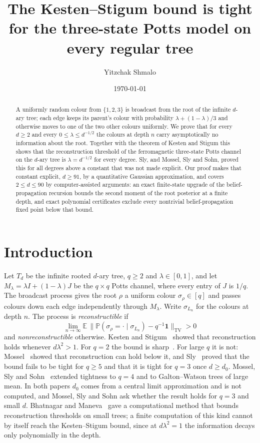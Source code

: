 \documentclass[11pt]{amsart}
\title[The three-state Potts model on regular trees]{The Kesten--Stigum bound is tight for the three-state Potts model on every regular tree}
\author{Yitzchak Shmalo}
\date{\today}
\theoremstyle{definition}
\theoremstyle{remark}
\newcommand{\E}{\mathbb{E}}
\newcommand{\PP}{\mathbb{P}}
\newcommand{\one}{\mathbf{1}}
\begin{document}
\begin{abstract}
A uniformly random colour from $\{1,2,3\}$ is broadcast from the root of the infinite $d$-ary tree; each
edge keeps its parent's colour with probability $\lambda+(1-\lambda)/3$ and otherwise moves to one of the
two other colours uniformly. We prove that for every $d\ge2$ and every $0\le\lambda\le d^{-1/2}$ the
colours at depth $n$ carry asymptotically no information about the root. Together with the theorem of
Kesten and Stigum this shows that the reconstruction threshold of the ferromagnetic three-state Potts
channel on the $d$-ary tree is $\lambda=d^{-1/2}$ for every degree. Sly, and Mossel, Sly and Sohn, proved
this for all degrees above a constant that was not made explicit. Our proof makes that constant explicit,
$d\ge91$, by a quantitative Gaussian approximation, and covers $2\le d\le90$ by computer-assisted
arguments: an exact finite-state upgrade of the belief-propagation recursion bounds the second moment of
the root posterior at a finite depth, and exact polynomial certificates exclude every nontrivial
belief-propagation fixed point below that bound.
\end{abstract}

\maketitle

\section{Introduction}

Let $T_d$ be the infinite rooted $d$-ary tree, $q\ge2$ and $\lambda\in[0,1]$, and let
$M_\lambda=\lambda I+(1-\lambda)J$ be the $q\times q$ Potts channel, where every entry of $J$ is $1/q$.
The broadcast process gives the root $\rho$ a uniform colour $\sigma_\rho\in[q]$ and passes colours
down each edge independently through $M_\lambda$. Write $\sigma_{L_n}$ for the colours at depth $n$. The
process is \emph{reconstructible} if
\[
\lim_{n\to\infty}\E\,\big\|\PP(\sigma_\rho=\cdot\mid\sigma_{L_n})-q^{-1}\one\big\|_{\mathrm{TV}}>0
\]
and \emph{nonreconstructible} otherwise. Kesten and Stigum~\cite{KS66} showed that reconstruction holds
whenever $d\lambda^2>1$. For $q=2$ the bound is sharp~\cite{BRZ95,EKPS00}. For large $q$ it is not:
Mossel~\cite{Mos01} showed that reconstruction can hold below it, and Sly~\cite{Sly11} proved that the
bound fails to be tight for $q\ge5$ and that it is tight for $q=3$ once $d\ge d_0$. Mossel, Sly and
Sohn~\cite{MSS22} extended tightness to $q=4$ and to Galton--Watson trees of large mean. In both papers
$d_0$ comes from a central limit approximation and is not computed, and Mossel, Sly and Sohn ask whether
the result holds for $q=3$ and small $d$. Bhatnagar and Maneva~\cite{BM11} gave a computational method
that bounds reconstruction thresholds on small trees; a finite computation of this kind cannot by itself
reach the Kesten--Stigum bound, since at $d\lambda^2=1$ the information decays only polynomially in the
depth.
\end{document}
